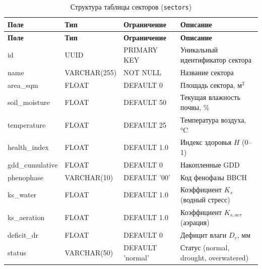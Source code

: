 \begin{longtable}{|I{3.0cm}|p{3.5cm}|R{3.0cm}|R{4.8cm}|}
	\caption{Структура таблицы секторов (\texttt{sectors})} \label{tab:db_sectors}           \\

	\hline
	\textbf{Поле}       & \textbf{Тип}      & \textbf{Ограничение}    & \textbf{Описание}              \\ \hline
	\endfirsthead

	\tabcont{\ref{tab:db_sectors}}
	\textbf{Поле}       & \textbf{Тип}      & \textbf{Ограничение}    & \textbf{Описание}              \\ \hline
	\endhead

	\hline
	\endfoot

	\hline
	\endlastfoot

	id                   & UUID              & PRIMARY KEY             & Уникальный идентификатор сектора   \\ \hline
	name                 & VARCHAR(255)      & NOT NULL                & Название сектора                   \\ \hline
	area\_sqm            & FLOAT             & DEFAULT 0               & Площадь сектора, м$^2$             \\ \hline
	soil\_moisture       & FLOAT             & DEFAULT 50              & Текущая влажность почвы, \%        \\ \hline
	temperature          & FLOAT             & DEFAULT 25              & Температура воздуха, °C            \\ \hline
	health\_index        & FLOAT             & DEFAULT 1.0             & Индекс здоровья $H$ (0--1)         \\ \hline
	gdd\_cumulative      & FLOAT             & DEFAULT 0               & Накопленные GDD                    \\ \hline
	phenophase           & VARCHAR(10)       & DEFAULT '00'            & Код фенофазы BBCH                  \\ \hline
	ks\_water            & FLOAT             & DEFAULT 1.0             & Коэффициент $K_s$ (водный стресс)  \\ \hline
	ks\_aeration         & FLOAT             & DEFAULT 1.0             & Коэффициент $K_{s,aer}$ (аэрация)  \\ \hline
	deficit\_dr          & FLOAT             & DEFAULT 0               & Дефицит влаги $D_r$, мм            \\ \hline
	status               & VARCHAR(50)       & DEFAULT 'normal'        & Статус (normal, drought, overwatered) \\ \hline

\end{longtable}
